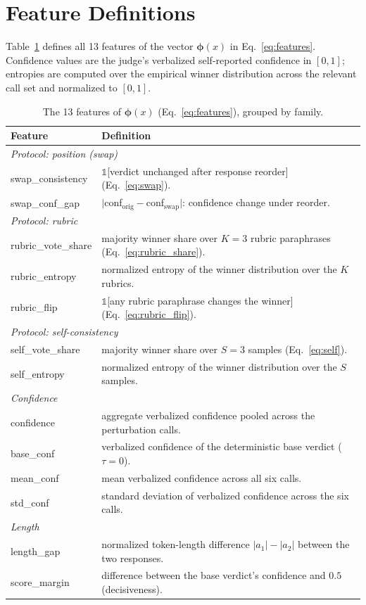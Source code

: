 \section{Feature Definitions}
\label{app:features}
Table~\ref{tab:featdef} defines all 13 features of the vector $\boldsymbol\phi(x)$ in Eq.~\eqref{eq:features}. Confidence values are the judge's verbalized self-reported confidence in $[0,1]$; entropies are computed over the empirical winner distribution across the relevant call set and normalized to $[0,1]$.

\begin{table}[t]
\centering
\small
\setlength{\tabcolsep}{3pt}
\caption{The 13 features of $\boldsymbol\phi(x)$ (Eq.~\ref{eq:features}), grouped by family.}
\label{tab:featdef}
\begin{tabular}{p{}p{}}
\toprule
Feature & Definition \\
\midrule
\multicolumn{2}{l}{\emph{Protocol: position (swap)}}\\
swap\_consistency & $\mathbb{1}$[verdict unchanged after response reorder] (Eq.~\ref{eq:swap}).\\
swap\_conf\_gap & $|$conf$_{\text{orig}}-$conf$_{\text{swap}}|$: confidence change under reorder.\\
\midrule
\multicolumn{2}{l}{\emph{Protocol: rubric}}\\
rubric\_vote\_share & majority winner share over $K{=}3$ rubric paraphrases (Eq.~\ref{eq:rubric_share}).\\
rubric\_entropy & normalized entropy of the winner distribution over the $K$ rubrics.\\
rubric\_flip & $\mathbb{1}$[any rubric paraphrase changes the winner] (Eq.~\ref{eq:rubric_flip}).\\
\midrule
\multicolumn{2}{l}{\emph{Protocol: self-consistency}}\\
self\_vote\_share & majority winner share over $S{=}3$ samples (Eq.~\ref{eq:self}).\\
self\_entropy & normalized entropy of the winner distribution over the $S$ samples.\\
\midrule
\multicolumn{2}{l}{\emph{Confidence}}\\
confidence & aggregate verbalized confidence pooled across the perturbation calls.\\
base\_conf & verbalized confidence of the deterministic base verdict ($\tau{=}0$).\\
mean\_conf & mean verbalized confidence across all six calls.\\
std\_conf & standard deviation of verbalized confidence across the six calls.\\
\midrule
\multicolumn{2}{l}{\emph{Length}}\\
length\_gap & normalized token-length difference $|a_1|-|a_2|$ between the two responses.\\
score\_margin & difference between the base verdict's confidence and $0.5$ (decisiveness).\\
\bottomrule
\end{tabular}
\end{table}

